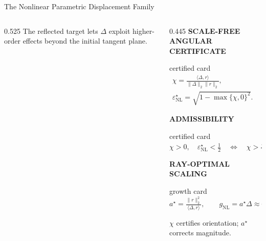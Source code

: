 \begin{frame}[t]{The Nonlinear Parametric Displacement Family}
\begin{columns}[T,onlytextwidth]
\begin{column}{0.525\textwidth}
      \vspace{0.08cm}
      {\fontsize{6.9}{8.2}\selectfont
      The reflected target lets $\Delta$ exploit higher-order effects beyond
      the initial tangent plane.}
    \end{column}

    \begin{column}{0.445\textwidth}
      {\color{EnstaBlue}\bfseries\scriptsize SCALE-FREE ANGULAR CERTIFICATE}
      \vspace{0.04cm}

      \begin{beamercolorbox}[rounded=true,sep=0.11cm,wd=\linewidth]{certified card}
        \centering
        \fontsize{6.8}{8.1}\selectfont
        \(\displaystyle
          \begin{gathered}
            \chi=\frac{\langle\Delta,r\rangle}
            {\lVert\Delta\rVert_2\lVert r\rVert_2},\\[5pt]
            \varepsilon_{\mathrm{NL}}^\star
            =\sqrt{1-\max\{\chi,0\}^2}.
          \end{gathered}
        \)
      \end{beamercolorbox}

      \vspace{0.10cm}
      {\color{EnstaBlue}\bfseries\scriptsize ADMISSIBILITY}
      \vspace{0.04cm}

      \begin{beamercolorbox}[rounded=true,sep=0.11cm,wd=\linewidth]{certified card}
        \centering
        \fontsize{6.9}{8.2}\selectfont
        \(\displaystyle
          \chi>0,\quad \varepsilon_{\mathrm{NL}}^\star<\frac12
          \quad\Longleftrightarrow\quad
          \chi>\frac{\sqrt3}{2}
        \)
      \end{beamercolorbox}

      \vspace{0.10cm}
      {\color{EnstaBlue}\bfseries\scriptsize RAY-OPTIMAL SCALING}
      \vspace{0.04cm}

      \begin{beamercolorbox}[rounded=true,sep=0.11cm,wd=\linewidth]{growth card}
        \centering
        \fontsize{6.9}{8.2}\selectfont
        \(\displaystyle
          a^\star=\frac{\lVert r\rVert_2^2}{\langle\Delta,r\rangle},
          \qquad g_{\mathrm{NL}}=a^\star\Delta\approx r
        \)
      \end{beamercolorbox}

      \vspace{0.09cm}
      {\fontsize{6.9}{8.2}\selectfont
      $\chi$ certifies orientation; $a^\star$ corrects magnitude.}
    \end{column}
  \end{columns}

\end{frame}
